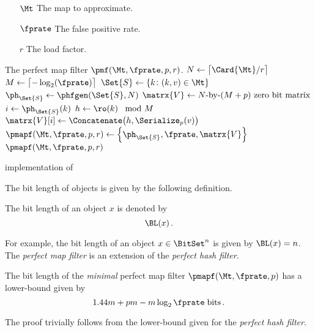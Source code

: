 \documentclass[ ../main.tex]{subfiles}
\begin{document}
\begin{algorithm}
\label{alg:pmf}
    \KwIn
    {
        \begin{itemize}
            \item[$\Mt$] The map to approximate.
            \item[$\fprate$] The false positive rate.
            \item[$r$] The load factor.
        \end{itemize}
    }
    \KwOut
    {
        The perfect map filter $\pmf(\Mt, \fprate, p, r)$.
    }
    {
        $N \gets \left\lceil \Card{\Mt} / r \right\rceil$\;
        $M \gets \left\lceil -\log_2\!\left(\fprate\right) \right\rceil$\;
        $\Set{S} \gets \{ k \colon (k,v) \in \Mt \}$\;
        $\ph_{\Set{S}} \gets \phfgen(\Set{S}, N)$\;
        $\matrx{V} \gets \text{$N$-by-$(M+p)$ zero bit matrix}$\;
        {
            $i \gets \ph_{\Set{S}}\!\left(k\right)$\;
            $h \gets \ro\!\left(k\right) \mod M$\;
            $\matrx{V}\!\left[i\right] \gets \Concatenate\!\left(h, \Serialize_p(v)\right)$\;
        }
        $\pmapf(\Mt, \fprate, p, r) \gets \left\{\ph_{\Set{S}}, \fprate, \matrx{V}\right\}$\;
        \Return $\pmapf(\Mt, \fprate, p, r)$\;
    }
\caption[Approximate map constructor]{\protect\pmapf implementation of \protect\MakeApproximateMap}
\end{algorithm}

The bit length of objects is given by the following definition.
\begin{definition}
The bit length of an object $x$ is denoted by
\begin{equation}
    \BL(x)\,.
\end{equation}
\end{definition}
For example, the bit length of an object $x \in \BitSet^n$ is given by $\BL(x) = n$.
The \emph{perfect map filter} is an extension of the \emph{perfect hash filter}\cite{phf}.

\begin{theorem}
The bit length of the \emph{minimal} perfect map filter $\pmapf(\Mt,\fprate,p)$ has a lower-bound given by
\begin{equation}
    1.44 m + p m - m \log_2 \fprate \; \si{bits}\,.
\end{equation}
\end{theorem}
The proof trivially follows from the lower-bound given for the \emph{perfect hash filter}\cite{phf}.
\end{document}
